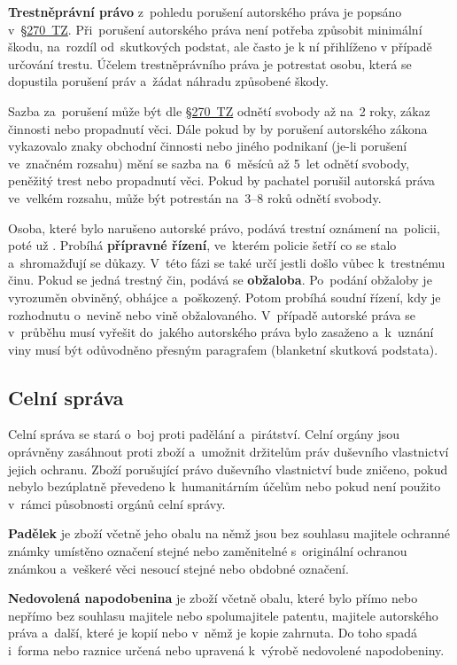 \textbf{Trestněprávní právo} z~pohledu porušení autorského práva je popsáno v~\href{https://www.zakonyprolidi.cz/cs/2009-40#p270}{§270~TZ}. Při~porušení autorského práva není potřeba způsobit minimální škodu, na~rozdíl od~skutkových podstat, ale často je k ní přihlíženo v případě určování trestu. Účelem trestněprávního práva je potrestat osobu, která se dopustila porušení práv a~žádat náhradu způsobené škody.

Sazba za~porušení může být dle \href{https://www.zakonyprolidi.cz/cs/2009-40#p270}{§270~TZ} odnětí svobody až na~2 roky, zákaz činnosti nebo propadnutí věci. Dále pokud by by porušení autorského zákona vykazovalo znaky obchodní činnosti nebo jiného podnikaní (je-li porušení ve~značném rozsahu) mění se sazba na~6~měsíců až 5~let odnětí svobody, peněžitý trest nebo propadnutí věci. Pokud by pachatel porušil autorská práva ve~velkém rozsahu, může být potrestán na~3--8 roků odnětí svobody.

Osoba, které bylo narušeno autorské právo, podává trestní oznámení na~policii, poté už . Probíhá \textbf{přípravné řízení}, ve~kterém policie šetří co se stalo a~shromažďují se důkazy. V~této fázi se také určí jestli došlo vůbec k~trestnému činu. Pokud se jedná trestný čin, podává se \textbf{obžaloba}. Po~podání obžaloby je vyrozuměn obviněný, obhájce a~poškozený. Potom probíhá soudní řízení, kdy je rozhodnutu o~nevině nebo vině obžalovaného. V~případě autorské práva se v~průběhu musí vyřešit do~jakého autorského práva bylo zasaženo a~k~uznání viny musí být odůvodněno přesným paragrafem (blanketní skutková podstata).

\subsection{Celní správa}

Celní správa se stará o~boj proti padělání a~pirátství. Celní orgány jsou oprávněny zasáhnout proti zboží a~umožnit držitelům práv duševního vlastnictví jejich ochranu. Zboží porušující právo duševního vlastnictví bude zničeno, pokud nebylo bezúplatně převedeno k~humanitárním účelům nebo pokud není použito v~rámci působnosti orgánů celní správy.

\textbf{Padělek} je zboží včetně jeho obalu na němž jsou bez souhlasu majitele ochranné známky umístěno označení stejné nebo zaměnitelné s~originální ochranou známkou a~veškeré věci nesoucí stejné nebo obdobné označení. 

\textbf{Nedovolená napodobenina} je zboží včetně obalu, které bylo přímo nebo nepřímo bez souhlasu majitele nebo spolumajitele patentu, majitele autorského práva a~další, které je kopií nebo v~němž je kopie zahrnuta. Do toho spadá i~forma nebo raznice určená nebo upravená k~výrobě nedovolené napodobeniny.

